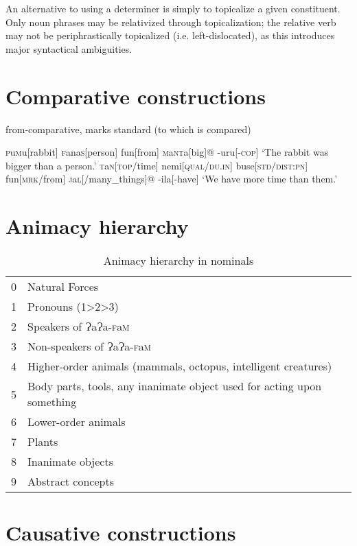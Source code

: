 \documentclass[a4paper,10pt,twoside,openright]{memoir}
\newcommand{\lang}{ɁaɁa-\textsc{f}a\textsc{m}}
\newcommand{\famword}[5]{#1\textsc{#2}#3\textsc{#4}#5}
\begin{document}
An alternative to using a determiner is simply to topicalize a given constituent. Only noun phrases may be relativized through topicalization; the relative verb may not be periphrastically topicalized (i.e. left-dislocated), as this introduces major syntactical ambiguities.

\section{Comparative constructions}

from-comparative, marks standard (to which is compared)

\pex[interpartskip=3ex]
\a
\begingl
\famword{}{p}{u}{m}{u}[rabbit]
\famword{}{f}{ana}{s}{}[person]
fun[from]
\famword{}{m}{a}{nt}{a}[big]@
-uru[\textsc{-cop}]
\glft `The rabbit was bigger than a person.'
\endgl
\a
\begingl
\famword{}{t}{a}{n}{}[\textsc{top}/time]
nemi[\textsc{qual}/\textsc{du.in}]
buse[\textsc{std}/\textsc{dist:pn}]
fun[\textsc{mrk}/from]
\famword{}{j}{a}{l}{}[/many\_things]@
-ila[-have]
\glft `We have more time than them.'
\endgl
\xe

\section{Animacy hierarchy}

\begin{table}[ht]
    \centering
    \begin{tabular}{ll}
    0 & Natural Forces \\
    1 & Pronouns (1>2>3) \\
    2 & Speakers of \lang{} \\
    3 & Non-speakers of \lang{} \\
    4 & Higher-order animals (mammals, octopus, intelligent creatures) \\
    5 & \parbox[t]{7cm}{Body parts, tools, any inanimate object used for acting upon something} \\
    6 & Lower-order animals \\
    7 & Plants \\
    8 & Inanimate objects \\
    9 & Abstract concepts 
    \end{tabular}
    \caption{Animacy hierarchy in nominals}
    \label{tab:hierarchy}
\end{table}

\section{Causative constructions}
\end{document}
